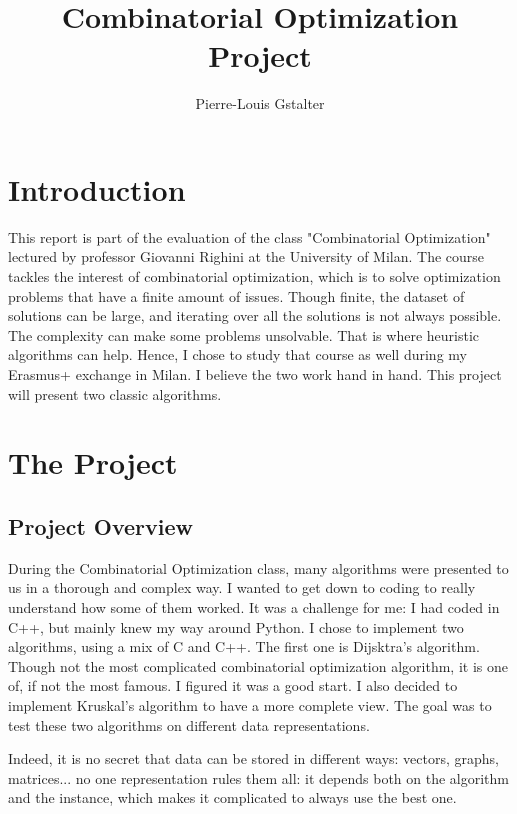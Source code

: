 \documentclass{article}
\title{Combinatorial Optimization Project}
\author{Pierre-Louis Gstalter}
\begin{document}
\maketitle

\tableofcontents
\newpage

\section{Introduction}

This report is part of the evaluation of the class "Combinatorial Optimization" lectured by professor Giovanni Righini at the University of Milan. The course tackles the interest of combinatorial optimization, which is to solve optimization problems that have a finite amount of issues. Though finite, the dataset of solutions can be large, and iterating over all the solutions is not always possible. The complexity can make some problems unsolvable. That is where heuristic algorithms can help. Hence, I chose to study that course as well during my Erasmus+ exchange in Milan. I believe the two work hand in hand. This project will present two classic algorithms.

\section{The Project}

\subsection{Project Overview}
During the Combinatorial Optimization class, many algorithms were presented to us in a thorough and complex way. I wanted to get down to coding to really understand how some of them worked. It was a challenge for me: I had coded in C++, but mainly knew my way around Python. I chose to implement two algorithms, using a mix of C and C++. The first one is Dijsktra's algorithm. Though not the most complicated combinatorial optimization algorithm, it is one of, if not the most famous. I figured it was a good start. I also decided to implement Kruskal's algorithm to have a more complete view. The goal was to test these two algorithms on different data representations.

Indeed, it is no secret that data can be stored in different ways: vectors, graphs, matrices... no one representation rules them all: it depends both on the algorithm and the instance, which makes it complicated to always use the best one.
\end{document}

